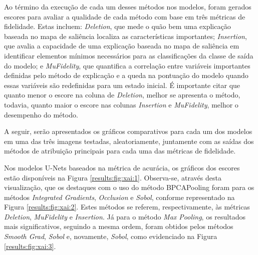 Ao término da execução de cada um desses métodos nos modelos, foram gerados escores para avaliar a qualidade de cada método com base em três métricas de fidelidade. Estas incluem: \textit{Deletion}, que mede o quão bem uma explicação baseada no mapa de saliência localiza as características importantes; \textit{Insertion}, que avalia a capacidade de uma explicação baseada no mapa de saliência em identificar elementos mínimos necessários para as classificações da classe de saída do modelo; e \textit{MuFidelity}, que quantifica a correlação entre variáveis importantes definidas pelo método de explicação e a queda na pontuação do modelo quando essas variáveis são redefinidas para um estado inicial. É importante citar que quanto menor o escore na coluna de \textit{Deletion}, melhor se apresenta o método, todavia, quanto maior o escore nas colunas \textit{Insertion} e \textit{MuFidelity}, melhor o desempenho do método.

A seguir, serão apresentados os gráficos comparativos para cada um dos modelos em uma das três imagens testadas, aleatoriamente, juntamente com as saídas dos métodos de atribuição principais para cada uma das métricas de fidelidade.

Nos modelos U-Nets baseados na métrica de acurácia, os gráficos dos escores estão disponíveis na Figura \ref{results:fig:xai:1}. Observa-se, através desta visualização, que os destaques com o uso do método BPCAPooling foram para os métodos \textit{Integrated Gradients}, \textit{Occlusion} e \textit{Sobol}, conforme representado na Figura \ref{results:fig:xai:2}. Estes métodos se referem, respectivamente, às métricas \textit{Deletion}, \textit{MuFidelity} e \textit{Insertion}. Já para o método \textit{Max Pooling}, os resultados mais significativos, seguindo a mesma ordem, foram obtidos pelos métodos \textit{Smooth Grad}, \textit{Sobol} e, novamente, \textit{Sobol}, como evidenciado na Figura \ref{results:fig:xai:3}.

